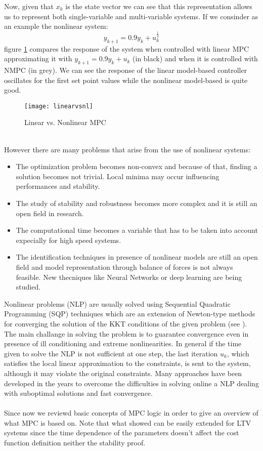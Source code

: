 Now, given that $x_k$ is the state vector we can see that this representation allows us to represent both single-variable and multi-variable systems. If we consinder as an example the nonlinear system:
\begin{equation}
y_{k+1}=0.9y_k+u_k^{\frac{1}{4}}
\end{equation}
figure \ref{linearvsnl} compares the response of the system when controlled with linear MPC approximating it with $y_{k+1} = 0.9y_k+u_k$ (in black) and when it is controlled with NMPC (in grey). We can see the response of the linear model-based controller oscillates for the first set point values while the nonlinear model-based is quite good. 
\begin{figure}[h!]
	\centering
	\texttt{[image: linearvsnl]}
	\caption{Linear vs. Nonlinear MPC}
	\label{linearvsnl}
\end{figure}\\
However there are many problems that arise from the use of nonlinear systems:
\begin{itemize}
\item The optimization problem becomes non-convex and because of that, finding a solution becomes not trivial. Local minima may occur influencing performances and stability.
\item The study of stability and robustness becomes more complex and it is still an open field in research.
\item The computational time becomes a variable that has to be taken into account expecially for high speed systems.
\item The identification techniques in presence of nonlinear models are still an open field and model representation through balance of forces is not always feasible. New thecniques like Neural Networks or deep learning are being studied.
\end{itemize} 
Nonlinear problems (NLP) are usually solved using Sequential Quadratic Programming (SQP) techniques which are an extension of Newton-type methods for converging the solution of the KKT conditions of the given problem (see \cite{skkt}). The main challange in solving the problem is to guarantee convergence even in presence of ill conditioning and extreme nonlinearities.
In general if the time given to solve the NLP is not sufficient at one step, the last iteration $u_k$, which satisfies the local linear approximation to the constraints, is sent to the system, although it may violate the original constraints. Many approaches have been developed in the years to overcome the difficulties in solving online a NLP dealing with suboptimal solutions and fast convergence. 
\\\\Since now we reviewd basic concepts of MPC logic in order to give an overview of what MPC is based on. Note that what showed can be easily extended for LTV systems since the time dependence of the parameters doesn't affect the cost function definition neither the stability proof.